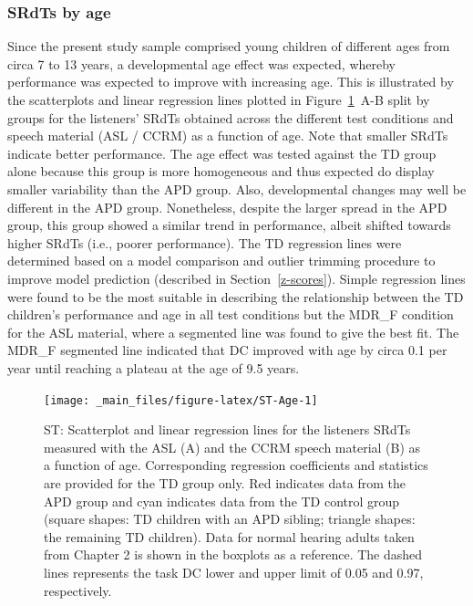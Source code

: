 \documentclass[a4paper, twoside]{templates/ociamthesis}
\begin{document}
\hypertarget{srdts-by-age}{%
\subsubsection*{SRdTs by age}\label{srdts-by-age}}

Since the present study sample comprised young children of different ages from circa 7 to 13 years, a developmental age effect was expected, whereby performance was expected to improve with increasing age. This is illustrated by the scatterplots and linear regression lines plotted in Figure~\ref{fig:ST-Age}~A-B split by groups for the listeners' SRdTs obtained across the different test conditions and speech material (ASL / CCRM) as a function of age. Note that smaller SRdTs indicate better performance. The age effect was tested against the TD group alone because this group is more homogeneous and thus expected do display smaller variability than the APD group. Also, developmental changes may well be different in the APD group. Nonetheless, despite the larger spread in the APD group, this group showed a similar trend in performance, albeit shifted towards higher SRdTs (i.e., poorer performance). The TD regression lines were determined based on a model comparison and outlier trimming procedure to improve model prediction (described in Section~\ref{z-scores}). Simple regression lines were found to be the most suitable in describing the relationship between the TD children's performance and age in all test conditions but the MDR\_F condition for the ASL material, where a segmented line was found to give the best fit. The MDR\_F segmented line indicated that DC improved with age by circa 0.1 per year until reaching a plateau at the age of 9.5 years.\\

\begin{figure}[h]

{\centering \texttt{[image: \_main\_files/figure-latex/ST-Age-1]} 

}

\caption{ST: Scatterplot and linear regression lines for the listeners SRdTs measured with the ASL (A) and the CCRM speech material (B) as a function of age. Corresponding regression coefficients and statistics are provided for the TD group only. Red indicates data from the APD group and cyan indicates data from the TD control group (square shapes: TD children with an APD sibling; triangle shapes: the remaining TD children). Data for normal hearing adults taken from Chapter 2 is shown in the boxplots as a reference. The dashed lines represents the task DC lower and upper limit of 0.05 and 0.97, respectively.}\label{fig:ST-Age}
\end{figure}
\end{document}
